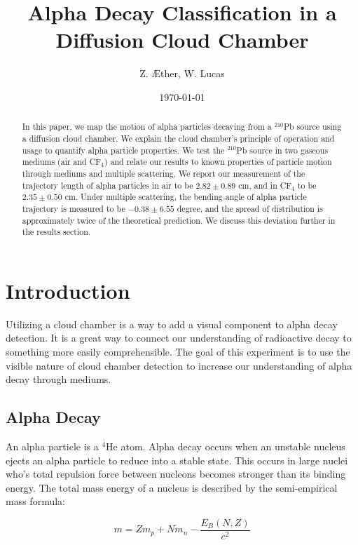 \documentclass[letterpaper,12pt]{article}
\begin{document}
\title{Alpha Decay Classification in a Diffusion Cloud Chamber}
\author{Z. \AE ther, W. Lucas}
\date{\today}
\maketitle

\begin{abstract}
    In this paper, we map the motion of alpha particles decaying from a $^{210}$Pb source using a diffusion cloud chamber. We explain the cloud chamber's principle of operation and usage to quantify alpha particle properties. We test the $^{210}$Pb source in two gaseous mediums (air and CF$_4$) and relate our results to known properties of particle motion through mediums and multiple scattering. We report our measurement of the trajectory length of alpha particles in air to be $2.82\pm 0.89$ cm, and in CF$_4$ to be $2.35 \pm 0.50$ cm. Under multiple scattering, the bending angle of alpha particle trajectory is measured to be $-0.38\pm 6.55$ degree, and the spread of distribution is approximately twice of the theoretical prediction. We discuss this deviation further in the results section. 
\end{abstract}

\pagebreak

\section{Introduction}

Utilizing a cloud chamber is a way to add a visual component to alpha decay detection. It is a great way to connect our understanding of radioactive decay to something more easily comprehensible. The goal of this experiment is to use the visible nature of cloud chamber detection to increase our understanding of alpha decay through mediums. 


\subsection{Alpha Decay}

An alpha particle is a $^4$He atom. Alpha decay occurs when an unstable nucleus ejects an alpha particle to reduce into a stable state. This occurs in large nuclei who's total repulsion force between nucleons becomes stronger than its binding energy. The total mass energy of a nucleus is described by the semi-empirical mass formula:

\begin{equation}
    m = Zm_p + Nm_n - \frac{E_B(N,Z)}{c^2}
\end{equation}
\end{document}

